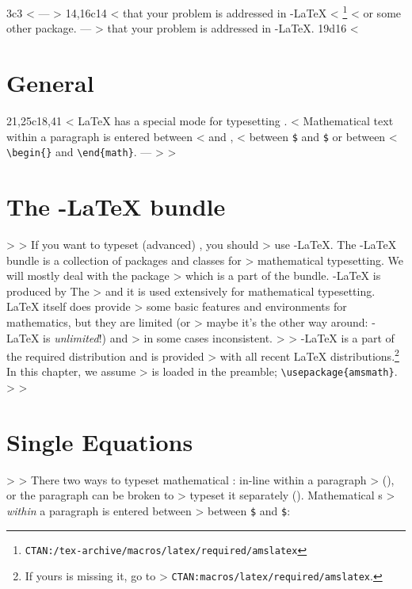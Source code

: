 3c3
< %
---
> %
14,16c14
<   that your problem is addressed in \AmS-\LaTeX{}%
<   \footnote{\texttt{CTAN:/tex-archive/macros/latex/required/amslatex}}
<   or some other package.
---
>   that your problem is addressed in \AmS-\LaTeX{}.
19d16
< \section{General}
21,25c18,41
< \LaTeX{} has a special mode for typesetting .
< Mathematical text within a paragraph is entered between \ci{(}
< and \ci{)},  %
< between \texttt{\$} and \texttt{\$} or between %
< \verb|\begin{|\verb|}| and \verb|\end{math}|.
---
> 
> \section{The \texorpdfstring{\AmS}{AMS}-\LaTeX{} bundle}
> 
> If you want to typeset (advanced) , you should
> use \AmS-\LaTeX{}. The \AmS-\LaTeX{} bundle is a collection of packages and classes for
> mathematical typesetting. We will mostly deal with the  package
> which is a part of the bundle. \AmS-\LaTeX{} is produced by The \emph{} 
> and it is used extensively for mathematical typesetting. \LaTeX{} itself does provide
> some basic features and environments for mathematics, but they are limited (or
> maybe it's the other way around: \AmS-\LaTeX{} is \emph{unlimited}!) and
> in some cases inconsistent. 
> 
> \AmS-\LaTeX{} is a part of the required distribution and is provided
> with all recent \LaTeX{} distributions.\footnote{If yours is missing it, go to
>   \texttt{CTAN:macros/latex/required/amslatex}.} In this chapter, we assume
>    is loaded in the preamble; \verb|\usepackage{amsmath}|.
> 
> \section{Single Equations}
>   
> There two ways to typeset mathematical : in-line within a paragraph
> (\emph{}), or the paragraph can be broken to 
> typeset it separately (\textit{}). Mathematical s 
> \emph{within} a paragraph is entered between  %
> between \texttt{\$} and \texttt{\$}:
